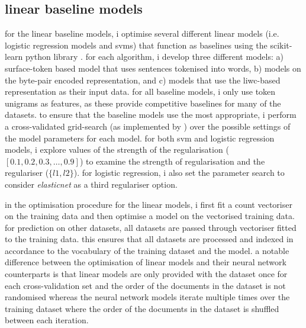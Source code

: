 \subsection{linear baseline models}\label{sec:baseline_models}
for the linear baseline models, i optimise several different linear models (i.e. logistic regression models and svms) that function as baselines using the scikit-learn python library \citet{pedregosa:2011}.
for each algorithm, i develop three different models: a) surface-token based model that uses sentences tokenised into words, b) models on the byte-pair encoded representation, and c) models that use the liwc-based representation as their input data.
for all baseline models, i only use token unigrams as features, as these provide competitive baselines for many of the datasets.
to ensure that the baseline models use the most appropriate, i perform a cross-validated grid-search (as implemented by \citet{pedregosa:2011}) over the possible settings of the model parameters for each model.
for both svm and logistic regression models, i explore values of the strength of the regularisation ($[0.1, 0.2, 0.3, \ldots, 0.9]$) to examine the strength of regularisation and the regulariser ($\{l1, l2\}$).
for logistic regression, i also set the parameter search to consider \textit{elasticnet} as a third regulariser option.

in the optimisation procedure for the linear models, i first fit a count vectoriser on the training data and then optimise a model on the vectorised training data.
for prediction on other datasets, all datasets are passed through vectoriser fitted to the training data.
this ensures that all datasets are processed and indexed in accordance to the vocabulary of the training dataset and the model. 
a notable difference between the optimisation of linear models and their neural network counterparts is that linear models are only provided with the dataset once for each cross-validation set and the order of the documents in the dataset is not randomised whereas the neural network models iterate multiple times over the training dataset where the order of the documents in the dataset is shuffled between each iteration.

